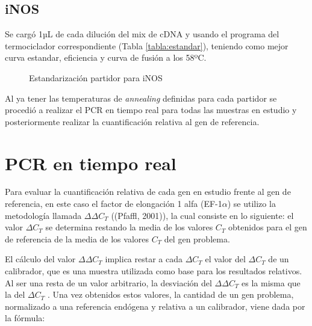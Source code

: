 \documentclass[12pt,a4paper,oneside]{scrbook}
\begin{document}
\subsection{iNOS}

Se cargó 1µL de cada dilución del mix de cDNA y usando el programa del
termociclador correspondiente (Tabla \ref{tabla:estandar}), teniendo
como mejor curva estandar, eficiencia y curva de fusión a los 58ºC.

\begin{figure}[h!]
    \centering
    \caption {Estandarización partidor para iNOS}
    \label {fig:inos}
\end{figure}

Al ya tener las temperaturas de \emph{annealing} definidas para cada
partidor se procedió a realizar el PCR en tiempo real para todas las
muestras en estudio y posteriormente realizar la cuantificación relativa
al gen de referencia.

\section{PCR en tiempo real}

Para evaluar la cuantificación relativa de cada gen en estudio frente al
gen de referencia, en este caso el factor de elongación 1 alfa
(EF-1$\alpha$) se utilizo la metodología llamada $\Delta\Delta C_T$
((Pfaffl, 2001)), la cual consiste en lo siguiente: el valor
$\Delta C_T$ se determina restando la media de los valores $C_T$
obtenidos para el gen de referencia de la media de los valores $C_T$ del
gen problema.

El cálculo del valor $\Delta\Delta C_T$ implica restar a cada
$\Delta C_T$ el valor del $\Delta C_T$ de un calibrador, que es una
muestra utilizada como base para los resultados relativos. Al ser una
resta de un valor arbitrario, la desviación del $\Delta\Delta C_T$ es la
misma que la del $\Delta C_T$ . Una vez obtenidos estos valores, la
cantidad de un gen problema, normalizado a una referencia endógena y
relativa a un calibrador, viene dada por la fórmula:
\end{document}
